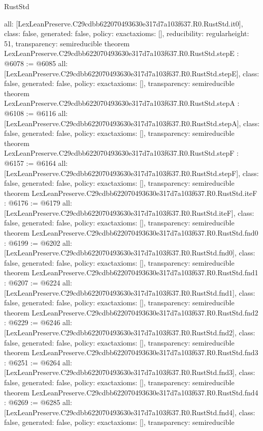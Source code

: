 \begin{lexlean}{RustStd}
\begin{coremodule}
{  all: [LexLeanPreserve.C29cdbb622070493630e317d7a103f637.R0.RustStd.it0],
  class: false,
  generated: false,
  policy: exact{axioms: []},
  reducibility: regular{height: 51},
  transparency: semireducible
}
theorem LexLeanPreserve.C29cdbb622070493630e317d7a103f637.R0.RustStd.stepE : @6078 := @6085 {
  all: [LexLeanPreserve.C29cdbb622070493630e317d7a103f637.R0.RustStd.stepE],
  class: false,
  generated: false,
  policy: exact{axioms: []},
  transparency: semireducible
}
theorem LexLeanPreserve.C29cdbb622070493630e317d7a103f637.R0.RustStd.stepA : @6108 := @6116 {
  all: [LexLeanPreserve.C29cdbb622070493630e317d7a103f637.R0.RustStd.stepA],
  class: false,
  generated: false,
  policy: exact{axioms: []},
  transparency: semireducible
}
theorem LexLeanPreserve.C29cdbb622070493630e317d7a103f637.R0.RustStd.stepF : @6157 := @6164 {
  all: [LexLeanPreserve.C29cdbb622070493630e317d7a103f637.R0.RustStd.stepF],
  class: false,
  generated: false,
  policy: exact{axioms: []},
  transparency: semireducible
}
theorem LexLeanPreserve.C29cdbb622070493630e317d7a103f637.R0.RustStd.iteF : @6176 := @6179 {
  all: [LexLeanPreserve.C29cdbb622070493630e317d7a103f637.R0.RustStd.iteF],
  class: false,
  generated: false,
  policy: exact{axioms: []},
  transparency: semireducible
}
theorem LexLeanPreserve.C29cdbb622070493630e317d7a103f637.R0.RustStd.fnd0 : @6199 := @6202 {
  all: [LexLeanPreserve.C29cdbb622070493630e317d7a103f637.R0.RustStd.fnd0],
  class: false,
  generated: false,
  policy: exact{axioms: []},
  transparency: semireducible
}
theorem LexLeanPreserve.C29cdbb622070493630e317d7a103f637.R0.RustStd.fnd1 : @6207 := @6224 {
  all: [LexLeanPreserve.C29cdbb622070493630e317d7a103f637.R0.RustStd.fnd1],
  class: false,
  generated: false,
  policy: exact{axioms: []},
  transparency: semireducible
}
theorem LexLeanPreserve.C29cdbb622070493630e317d7a103f637.R0.RustStd.fnd2 : @6229 := @6246 {
  all: [LexLeanPreserve.C29cdbb622070493630e317d7a103f637.R0.RustStd.fnd2],
  class: false,
  generated: false,
  policy: exact{axioms: []},
  transparency: semireducible
}
theorem LexLeanPreserve.C29cdbb622070493630e317d7a103f637.R0.RustStd.fnd3 : @6251 := @6264 {
  all: [LexLeanPreserve.C29cdbb622070493630e317d7a103f637.R0.RustStd.fnd3],
  class: false,
  generated: false,
  policy: exact{axioms: []},
  transparency: semireducible
}
theorem LexLeanPreserve.C29cdbb622070493630e317d7a103f637.R0.RustStd.fnd4 : @6269 := @6285 {
  all: [LexLeanPreserve.C29cdbb622070493630e317d7a103f637.R0.RustStd.fnd4],
  class: false,
  generated: false,
  policy: exact{axioms: []},
  transparency: semireducible
}
\end{coremodule}
\end{lexlean}
